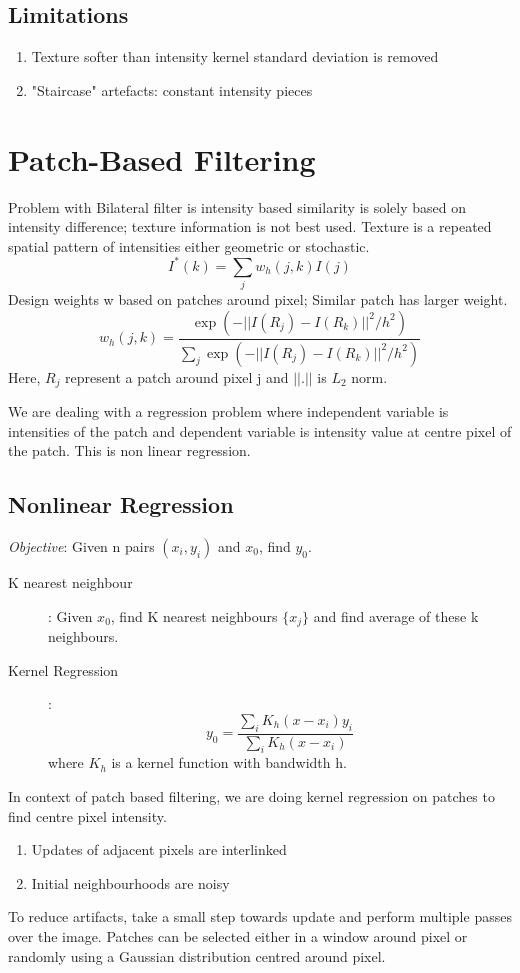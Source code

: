 \documentclass[a4paper,11pt]{article}
\begin{document}
\subsection{Limitations}
\begin{enumerate}
\item Texture softer than intensity kernel standard deviation is removed
\item "Staircase" artefacts: constant intensity pieces
\end{enumerate}

\section{Patch-Based Filtering}
Problem with Bilateral filter is intensity based similarity is solely based on intensity difference; texture information is not best used. Texture is a repeated spatial pattern of intensities either geometric or stochastic.
$$I^*(k) = \sum_{j}w_h(j,k)I(j)$$
Design weights w based on patches around pixel; Similar patch has larger weight.
$$w_h(j,k) = \frac{\exp{(-||I(R_j)-I(R_k)||^2/h^2)}}{\sum_{j}\exp{(-||I(R_j)-I(R_k)||^2/h^2)}}$$
Here, $R_j$ represent a patch around pixel j and $||.||$ is $L_2$ norm.
\medskip

We are dealing with a regression problem where independent variable is intensities of the patch and dependent variable is intensity value at centre pixel of the patch. This is non linear regression.

\subsection{Nonlinear Regression}
\textit{Objective}: Given n pairs $(x_i, y_i)$ and $x_0$, find $y_0$.
\begin{description}
\item[K nearest neighbour]: Given $x_0$, find K nearest neighbours $\{x_j\}$ and find average of these k neighbours.
\item[Kernel Regression]: $$y_0 = \frac{\sum_i K_h(x-x_i)y_i }{\sum_i K_h(x-x_i)}$$ where $K_h$ is a kernel function with bandwidth h.
\end{description}
In context of patch based filtering, we are doing kernel regression on patches to find centre pixel intensity.
\begin{enumerate}
\item Updates of adjacent pixels are interlinked
\item Initial neighbourhoods are noisy
\end{enumerate}
To reduce artifacts, take a small step towards update and perform multiple passes over the image.
Patches can be selected either in a window around pixel or randomly using a Gaussian distribution centred around pixel.
\end{document}
